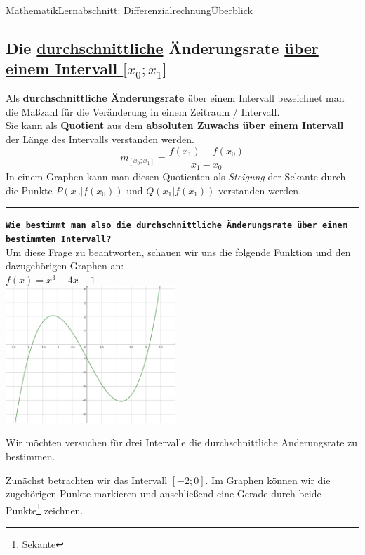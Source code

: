 \documentclass[11pt,twocolumn,oneside,openany,headings=optiontotoc,11pt,numbers=noenddot,final]{article}
\begin{document}
\begin{worksheet}{Mathematik}{Lernabschnitt: Differenzialrechnung}{Überblick}
		\subsection{Die \underline{durchschnittliche} Änderungsrate \underline{über einem Intervall \(\lbrack{}x_0;x_1\rbrack\)}}
		Als \textbf{durchschnittliche Änderungsrate} über einem Intervall bezeichnet man die Maßzahl für die Veränderung in einem Zeitraum / Intervall.\\
		Sie kann als \textbf{Quotient} aus dem \textbf{absoluten Zuwachs über einem Intervall} der Länge des Intervalls verstanden werden.
		\[m_{[x_0;x_1]} = \frac{f(x_1) - f(x_0)}{x_1 - x_0}\]
		In einem Graphen kann man diesen Quotienten als \textit{Steigung} der Sekante durch die Punkte \(P(x_0|f(x_0))\) und \(Q(x_1|f(x_1))\) verstanden werden.\\
		\rule{0.48\textwidth}{0.1pt}
		\texttt{\textbf{Wie bestimmt man also die durchschnittliche Änderungsrate über einem bestimmten Intervall?}}\\
		Um diese Frage zu beantworten, schauen wir uns die folgende Funktion und den dazugehörigen Graphen an:\\
		\(f(x) = x^3 - 4x - 1\)\\
		\includegraphics[width=0.48\textwidth]{../99_Bilder/04_Skr_DQFkt.png}\\
		\par\noindent
		Wir möchten versuchen für drei Intervalle die durchschnittliche Änderungsrate zu bestimmen.\\
		\par\noindent
		Zunächst betrachten wir das Intervall \([-2;0]\). Im Graphen können wir die zugehörigen Punkte markieren und anschließend eine Gerade durch beide Punkte\footnote{Sekante} zeichnen.\\
		\par\noindent
		\begin{minipage}{0.2\textwidth}

\end{minipage}
\end{worksheet}
\end{document}

